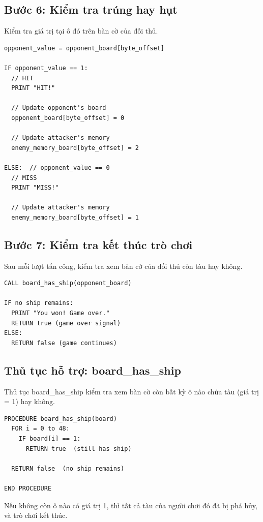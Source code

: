 \subsection{Bước 6: Kiểm tra trúng hay hụt}

Kiểm tra giá trị tại ô đó trên bàn cờ của đối thủ.

\begin{verbatim}
opponent_value = opponent_board[byte_offset]

IF opponent_value == 1:
  // HIT
  PRINT "HIT!"
  
  // Update opponent's board
  opponent_board[byte_offset] = 0
  
  // Update attacker's memory
  enemy_memory_board[byte_offset] = 2
  
ELSE:  // opponent_value == 0
  // MISS
  PRINT "MISS!"
  
  // Update attacker's memory
  enemy_memory_board[byte_offset] = 1
\end{verbatim}

\subsection{Bước 7: Kiểm tra kết thúc trò chơi}

Sau mỗi lượt tấn công, kiểm tra xem bàn cờ của đối thủ còn tàu hay không.

\begin{verbatim}
CALL board_has_ship(opponent_board)

IF no ship remains:
  PRINT "You won! Game over."
  RETURN true (game over signal)
ELSE:
  RETURN false (game continues)
\end{verbatim}

\subsection{Thủ tục hỗ trợ: board\_has\_ship}

Thủ tục board\_has\_ship kiểm tra xem bàn cờ còn bất kỳ ô nào chứa tàu (giá trị = 1) hay không.

\begin{verbatim}
PROCEDURE board_has_ship(board)
  FOR i = 0 to 48:
    IF board[i] == 1:
      RETURN true  (still has ship)
  
  RETURN false  (no ship remains)

END PROCEDURE
\end{verbatim}

Nếu không còn ô nào có giá trị 1, thì tất cả tàu của người chơi đó đã bị phá hủy, và trò chơi kết thúc.


